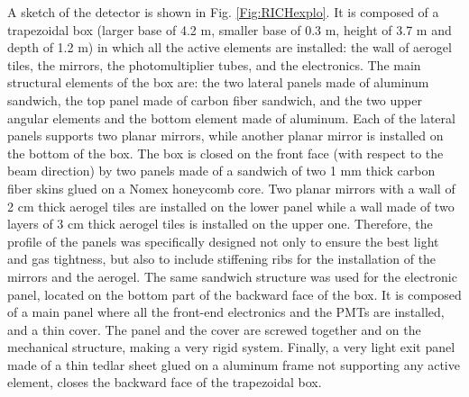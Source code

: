 \documentclass[5p,times,twocolumn]{elsarticle}
\begin{document}
A sketch of the detector is shown in Fig. \ref{Fig:RICHexplo}.
It is composed of a trapezoidal box (larger base of 4.2 m, smaller base of 0.3 m, height of 3.7 m and depth of 1.2 m) in which all the active elements are installed: the wall of aerogel tiles, the mirrors, the photomultiplier tubes, and the electronics.
The main structural elements of the box are: the two lateral panels made of aluminum sandwich, the top panel made of carbon fiber sandwich, and the two upper angular elements and the bottom element made of aluminum.
Each of the lateral panels supports two planar mirrors, while another planar mirror is installed on the bottom of the box.
The box is closed on the front face (with respect to the beam direction) by two panels made of a sandwich of two 1 mm thick carbon fiber skins glued on a Nomex honeycomb core.
Two planar mirrors with a wall of 2 cm thick aerogel tiles are installed on the lower panel while a wall made of two layers of 3 cm thick aerogel tiles is installed on the upper one. Therefore, the profile of the panels was specifically designed not only to ensure the best light and gas tightness, but also to include stiffening ribs for the installation of the mirrors and the aerogel.
The same sandwich structure was used for the electronic panel, located on the bottom part of the backward face of the box.
It is composed of a main panel where all the front-end electronics and the PMTs are installed, and a thin cover. The panel and the cover are screwed together and on the mechanical structure, making a very rigid system.
Finally, a very light exit panel made of a thin tedlar sheet glued on a aluminum frame not supporting any active element, closes the backward face of the trapezoidal box. 
\end{document}
